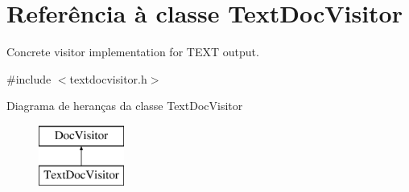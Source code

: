 \hypertarget{class_text_doc_visitor}{\section{Referência à classe Text\-Doc\-Visitor}
\label{class_text_doc_visitor}
}


Concrete visitor implementation for T\-E\-X\-T output.  




{\ttfamily \#include $<$textdocvisitor.\-h$>$}

Diagrama de heranças da classe Text\-Doc\-Visitor\begin{figure}[H]
\begin{center}
\leavevmode
\includegraphics[height=2.000000cm]{class_text_doc_visitor}
\end{center}
\end{figure}
